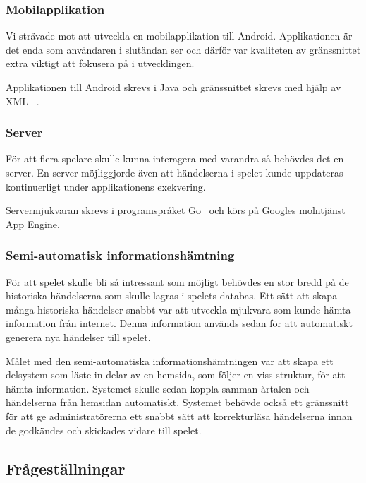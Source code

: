 \documentclass[a4paper, 11pt]{article}
\begin{document}
\subsubsection{Mobilapplikation}
Vi strävade mot att utveckla en mobilapplikation till Android. Applikationen är det enda som användaren i slutändan ser och därför var kvaliteten av gränssnittet extra viktigt att fokusera på i utvecklingen. 

Applikationen till Android skrevs i Java och gränssnittet skrevs med hjälp av XML ~\cite{xml}. 

\subsubsection{Server}
För att flera spelare skulle kunna interagera med varandra så behövdes det en server. En server möjliggjorde även att händelserna i spelet kunde uppdateras kontinuerligt under applikationens exekvering.

Servermjukvaran skrevs i programspråket Go~\cite{golang} och körs på Googles molntjänst App Engine.

\subsubsection{Semi-automatisk informationshämtning}
För att spelet skulle bli så intressant som möjligt behövdes en stor bredd på de historiska händelserna som skulle lagras i spelets databas. Ett sätt att skapa många historiska händelser snabbt var att utveckla mjukvara som kunde hämta information från internet. Denna information används sedan för att automatiskt generera nya händelser till spelet. 

Målet med den semi-automatiska informationshämtningen var att skapa ett delsystem som läste in delar av en hemsida, som följer en viss struktur, för att hämta information. Systemet skulle sedan koppla samman årtalen och händelserna från hemsidan automatiskt. Systemet behövde också ett gränssnitt för att ge administratörerna ett snabbt sätt att korrekturläsa händelserna innan de godkändes och skickades vidare till spelet.

\subsection{Frågeställningar}
\end{document}
